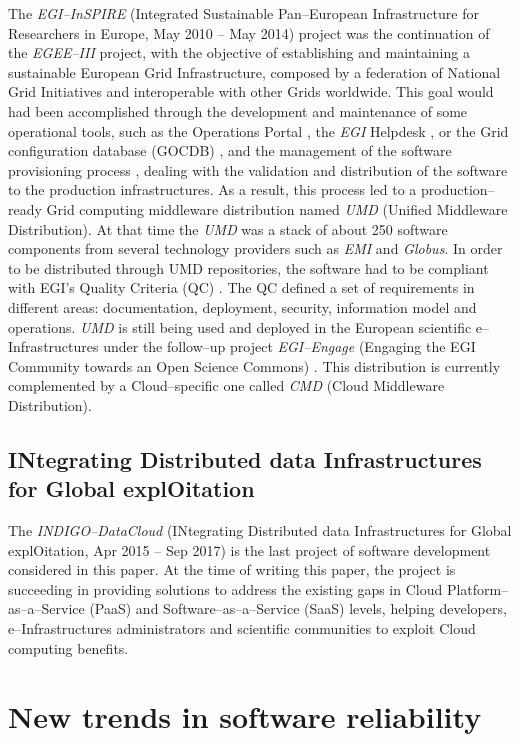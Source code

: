 \documentclass[journal]{IEEEtran}
\begin{document}
The {\sl EGI--InSPIRE} (Integrated Sustainable Pan--European Infrastructure for
Researchers in Europe, May 2010 -- May 2014) project \cite{cordis:egi-inspire}
was the continuation of the {\sl EGEE--III} project, with the objective of establishing and
maintaining a sustainable European Grid Infrastructure, composed by a federation of National
Grid Initiatives and interoperable with other Grids worldwide.
This goal would had been accomplished through the
development and maintenance of some operational tools, such as the Operations Portal \cite{egi-ops},
the {\sl EGI} Helpdesk \cite{ggus}, or the Grid configuration database (GOCDB) \cite{gocdb}, and the
management of the software provisioning process \cite{mario}, dealing with the validation and distribution of the software to
the production infrastructures. As a result, this process led to a production--ready
Grid computing middleware distribution named {\sl UMD} (Unified Middleware Distribution). At that time the {\sl UMD}
was a stack of about 250 software components from several technology providers such
as {\sl EMI} and {\sl Globus}. In order to be distributed through UMD
repositories, the software had to be compliant with EGI's Quality Criteria (QC) \cite{egi-qc}. The
QC defined a set of requirements in different areas: documentation, deployment, security, information
model and operations.
{\sl UMD} is still being used and
deployed in the European scientific e--Infrastructures under the follow--up
project {\sl EGI--Engage} (Engaging the EGI Community towards an Open Science
Commons) \cite{cordis:egi-engage}. This distribution is currently complemented
by a Cloud--specific one called {\sl CMD} (Cloud Middleware Distribution).

\subsection{INtegrating Distributed data Infrastructures for Global
explOitation}

The {\sl INDIGO--DataCloud} (INtegrating Distributed data Infrastructures for Global
explOitation, Apr 2015 -- Sep 2017) \cite{cordis:indigo} is the last
project of software development considered in this paper. At the time of writing
this paper, the project is succeeding in providing solutions to address the existing gaps in
Cloud Platform--as--a--Service (PaaS) and Software--as--a--Service (SaaS) levels,
helping developers, e--Infrastructures administrators and scientific communities to exploit
Cloud computing benefits.

\section{New trends in software reliability}
\label{sec:ntsr}
\end{document}
